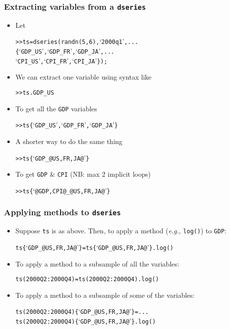 \documentclass[10pt]{beamer}
\newcommand{\myitem}{\item[$\bullet$]}
\begin{document}
\begin{frame}[fragile,t]
  \frametitle{Extracting variables from a \texttt{dseries}}
  \begin{itemize}
    \myitem Let
    \begin{alltt}
  >> ts = dseries(randn(5,6), `2000q1', ...
                 \{`GDP_US', `GDP_FR', `GDP_JA', ...
                  `CPI_US', `CPI_FR', `CPI_JA'\});
    \end{alltt}
    \myitem We can extract one variable using syntax like
    \begin{alltt}
  >> ts.GDP_US
    \end{alltt}
    \myitem To get all the \texttt{GDP} variables
    \begin{alltt}
  >> ts\{`GDP_US', `GDP_FR', `GDP_JA'\}
    \end{alltt}
    \myitem A shorter way to do the same thing
    \begin{alltt}
  >> ts\{`GDP_@US,FR,JA@'\}
    \end{alltt}
    \myitem To get \texttt{GDP} \& \texttt{CPI} (NB: max 2 implicit loops)
    \begin{alltt}
  >> ts\{`@GDP,CPI@_@US,FR,JA@'\}
    \end{alltt}
  \end{itemize}
\end{frame}


\begin{frame}[fragile,t]
  \frametitle{Applying methods to \texttt{dseries}}
  \begin{itemize}
    \myitem Suppose \texttt{ts} is as above. Then, to apply a method
    (\textit{e.g.,} \texttt{log()}) to \texttt{GDP}:
    \begin{alltt}
  ts\{`GDP_@US,FR,JA@'\}=ts\{`GDP_@US,FR,JA@'\}.log()
    \end{alltt}
    \myitem To apply a method to a subsample of all the variables:
    \begin{alltt}
  ts(2000Q2:2000Q4) = ts(2000Q2:2000Q4).log()
    \end{alltt}
    \myitem To apply a method to a subsample of some of the variables:
    \begin{alltt}
  ts(2000Q2:2000Q4)\{`GDP_@US,FR,JA@'\} = ...
    ts(2000Q2:2000Q4)\{`GDP_@US,FR,JA@'\}.log()
    \end{alltt}
  \end{itemize}
\end{frame}
\end{document}
